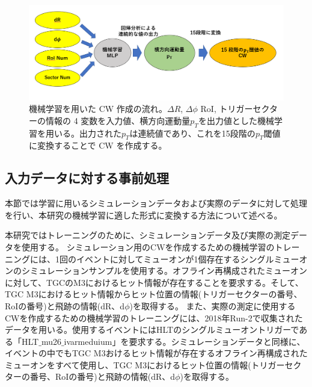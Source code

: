 \begin{figure}[tb]
  \centering
  \includegraphics[clip, width=15cm]{fig/4/MLPoverview.png}
  \caption{機械学習を用いた CW 作成の流れ。$\Delta R$, $\Delta \phi$ RoI, トリガーセクターの情報の 4 変数を入力値、横方向運動量$p_T$を出力値とした機械学習を用いる。出力された$p_T$は連続値であり、これを15段階の$p_T$閾値に変換することで CW を作成する。}
  \label{fig:MLP_over}
\end{figure}

\subsection{入力データに対する事前処理}\label{事前処理}
本節では学習に用いるシミュレーションデータおよび実際のデータに対して処理を行い、本研究の機械学習に適した形式に変換する方法について述べる。

本研究ではトレーニングのために、シミュレーションデータ及び実際の測定データを使用する。
シミュレーション用のCWを作成するための機械学習のトレーニングには、1回のイベントに対してミューオンが1個存在するシングルミューオンのシミュレーションサンプルを使用する。オフライン再構成されたミューオンに対して、TGCのM3におけるヒット情報が存在することを要求する。そして、TGC M3におけるヒット情報からヒット位置の情報(トリガーセクターの番号、RoIの番号)と飛跡の情報(dR、d$\phi$)を取得する。
また、実際の測定に使用するCWを作成するための機械学習のトレーニングには、2018年Run-2で収集されたデータを用いる。使用するイベントにはHLTのシングルミューオントリガーである「HLT$\_$mu26$\_$ivarmeduium」を要求する。シミュレーションデータと同様に、イベントの中でもTGC M3おけるヒット情報が存在するオフライン再構成されたミューオンをすべて使用し、TGC M3におけるヒット位置の情報(トリガーセクターの番号、RoIの番号)と飛跡の情報(dR、d$\phi$)を取得する。


